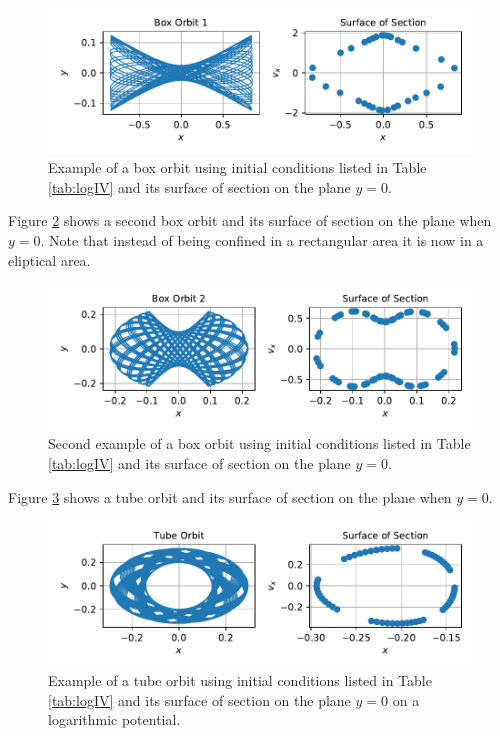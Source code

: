 \begin{figure}
    \centering
    \includegraphics{CodeAndFigures/LogPotentialBoxOrbitPlot.pdf}
    \caption{Example of a box orbit using initial conditions listed in Table \ref{tab:logIV} and its surface of section on the plane $y=0$.}
    \label{fig:logBox1}
\end{figure}

Figure \ref{fig:logBox2} shows a second box orbit and its surface of section on the plane when $y=0$. Note that instead of being confined in a rectangular area it is now in a eliptical area. 

\begin{figure}
    \centering
    \includegraphics{CodeAndFigures/LogPotentialBoxOrbit2Plot.pdf}
    \caption{Second example of a box orbit using initial conditions listed in Table \ref{tab:logIV} and its surface of section on the plane $y=0$.}
    \label{fig:logBox2}
\end{figure}

Figure \ref{fig:logTube} shows a tube orbit and its surface of section on the plane when $y=0$.

\begin{figure}
    \centering
    \includegraphics{CodeAndFigures/LogPotentialTubeOrbitPlot.pdf}
    \caption{Example of a tube orbit using initial conditions listed in Table \ref{tab:logIV} and its surface of section on the plane $y=0$ on a logarithmic potential.}
    \label{fig:logTube}
\end{figure}



\clearpage